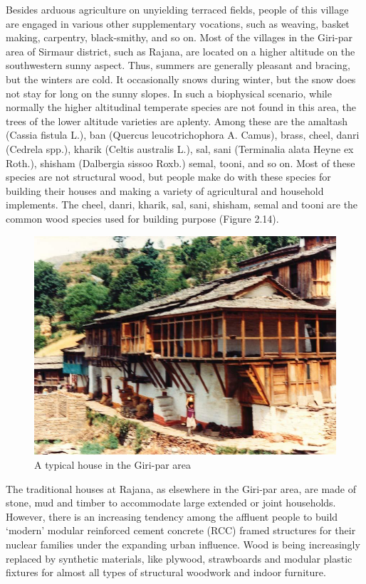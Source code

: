 Besides arduous agriculture on unyielding terraced fields, people of this village are engaged in various other supplementary vocations, such as weaving, basket making, carpentry, black-smithy, and so on. Most of the villages in the Giri-par area of Sirmaur district, such as Rajana, are located on a higher altitude on the southwestern sunny aspect. Thus, summers are generally pleasant and bracing, but the winters are cold. It occasionally snows during winter, but the snow does not stay for long on the sunny slopes. In such a biophysical scenario, while normally the higher altitudinal temperate species are not found in this area, the trees of the lower altitude varieties are aplenty. Among these are the amaltash (Cassia fistula L.), ban (Quercus leucotrichophora A. Camus), brass, cheel, danri (Cedrela spp.), kharik (Celtis australis L.), sal, sani (Terminalia alata Heyne ex Roth.), shisham (Dalbergia sissoo Roxb.) semal, tooni, and so on. Most of these species are not structural wood, but people make do with these species for building their houses and making a variety of agricultural and household implements. The cheel, danri, kharik, sal, sani, shisham, semal and tooni are the common wood species used for building purpose (Figure 2.14).

\begin{figure}[!htbp]
\includegraphics[scale=.34]{images/chap02-14.jpg}
\caption{A typical house in the Giri-par area}\label{chap02-fig14}
\end{figure}

The traditional houses at Rajana, as elsewhere in the Giri-par area, are made of stone, mud and timber to accommodate large extended or joint households. However, there is an increasing tendency among the affluent people to build ‘modern’ modular reinforced cement concrete (RCC) framed structures for their nuclear families under the expanding urban influence. Wood is being increasingly replaced by synthetic materials, like plywood, strawboards and modular plastic fixtures for almost all types of structural woodwork and indoor furniture.

